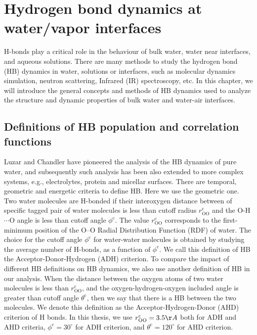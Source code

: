 \chapter{Hydrogen bond dynamics at water/vapor interfaces}\label{CHAPTER_HB}
H-bonds play a critical role in the behaviour of bulk water,\cite{Eisenberg1969,Luzar1996,Cabane2005} 
water near interfaces,\cite{Chowdhary2008} and aqueous solutions. \cite{Naslund2005} 
There are many methods to study the hydrogen bond (HB) dynamics in water, solutions or interfaces, 
such as molecular dynamics simulation,\cite{Tongraar2006,Chanda2006,Tongraar2010,Chowdhary2008,Banerjee2016} neutron scattering, 
Infrared (IR) spectroscopy,\cite{Werhahn2011,Fournier2016} etc.
In this chapter, we will introduce the general concepts and methods of HB dynamics \cite{AL96,Luzar1996,DC87} used to analyze the structure 
and dynamic properties of bulk water and water-air interfaces. 

\section{Definitions of HB population and correlation functions}
Luzar and Chandler \cite{AL96} have pioneered the analysis of the HB dynamics of pure water, and
subsequently such analysis has been also extended to more complex systems, e.g., electrolytes, \cite{AC00} protein and  micellar surfaces. \cite{SP05}
There are temporal, geometric\cite{Kumar2007} and energetic criteria \cite{Sciortino1989}to define HB.
Here we use the geometric one.
Two water molecules are H-bonded if their interoxygen distance between of specific tagged pair of water molecules 
is less than cutoff radius $r^{\text{c}}_{\text{OO}}$ and
the O-H$\cdots$O angle is less than cutoff angle $\phi^{\text{c}}$. \cite{AKS86,JT90,SB02} 
The value $r^{\text{c}}_{\text{OO}}$ corresponds to the first-minimum position of the O--O Radial Distribution Function (RDF) of water. \cite{Sciortino1989}   
The choice for the cutoff angle $\phi^{\text{c}}$ for water-water molecules is obtained by studying the average number of H-bonds,
as a function of $\phi^{\text{c}}$. \cite{Luzar1993} We call this definition of HB the Acceptor-Donor-Hydrogen (ADH) criterion. 
To compare the impact of different HB definitions on HB dynamics, we also use another definition of HB in our analysis. 
When the distance between the oxygen atoms of two water molecules is less than $r^{\text{c}}_{\text{OO}}$, 
and the oxygen-hydrogen-oxygen included angle is greater than cutoff angle $\theta^{\text{c}}$, then we say that there is a HB between the two molecules. 
We denote this definition as the Acceptor-Hydrogen-Donor (AHD) criterion of H bonds.
In this thesis, we use $r^{\text{c}}_{\text{OO}}=3.5\AA$ both for ADH and AHD criteria, $\phi^{\text{c}}=30^{\circ}$ for ADH criterion, 
and $\theta^{\text{c}}=120^{\circ}$ for AHD criterion.

